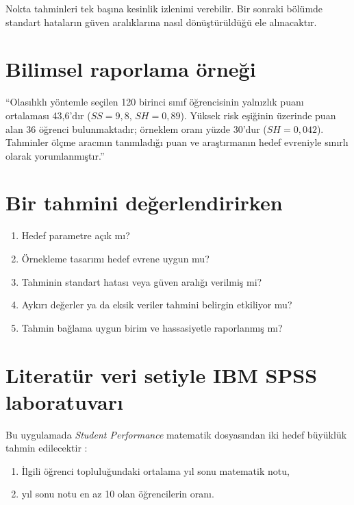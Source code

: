 Nokta tahminleri tek başına kesinlik izlenimi verebilir. Bir sonraki bölümde
standart hataların güven aralıklarına nasıl dönüştürüldüğü ele alınacaktır.

\section{Bilimsel raporlama örneği}

``Olasılıklı yöntemle seçilen 120 birinci sınıf öğrencisinin yalnızlık puanı
ortalaması 43,6'dır ($SS=9{,}8$, $SH=0{,}89$). Yüksek risk eşiğinin üzerinde
puan alan 36 öğrenci bulunmaktadır; örneklem oranı yüzde 30'dur
($SH=0{,}042$). Tahminler ölçme aracının tanımladığı puan ve araştırmanın hedef
evreniyle sınırlı olarak yorumlanmıştır.''

\section{Bir tahmini değerlendirirken}

\begin{enumerate}
  \item Hedef parametre açık mı?
  \item Örnekleme tasarımı hedef evrene uygun mu?
  \item Tahminin standart hatası veya güven aralığı verilmiş mi?
  \item Aykırı değerler ya da eksik veriler tahmini belirgin etkiliyor mu?
  \item Tahmin bağlama uygun birim ve hassasiyetle raporlanmış mı?
\end{enumerate}

\section{Literatür veri setiyle IBM SPSS laboratuvarı}

Bu uygulamada \emph{Student Performance} matematik dosyasından iki hedef
büyüklük tahmin edilecektir \cite{cortez2008data,cortezsilva2008}:

\begin{enumerate}
  \item İlgili öğrenci topluluğundaki ortalama yıl sonu matematik notu,
  \item yıl sonu notu en az 10 olan öğrencilerin oranı.
\end{enumerate}

